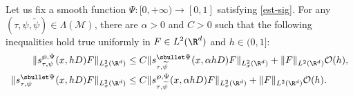 \begin{prop}\label{equiv-eucl}
Let us fix a smooth function $\Psi:[0,+\infty)\to [0,1]$ satisfying \eqref{est-sig}.
For any $(\tau,\psi,\widetilde{\psi})\in \Lambda(\mathcal{M})$, there are $\alpha>0$ and $C>0$ such that
the following inequalities hold true uniformly in $F\in L^2(\R^d)$ and $h\in(0,1]$:
\begin{align}\label{equi-eu1}
\|s_{\tau,\psi}^{\wp,\Psi}(x,hD)F \|_{L_x^2(\R^d)}& \leq C\| s_{\tau,\widetilde{\psi}}^{\sbullet\Psi}(x,\alpha hD)F \|_{L_x^2(\R^d)}+\|F\|_{L^2(\R^d)}\mathcal{O}(h),\\\label{equi-eu2}
\| s_{\tau,\psi}^{\sbullet\Psi}(x,hD)F \|_{L_x^2(\R^d)} & \leq C\|s_{\tau,\widetilde{\psi}}^{\wp,\Psi}(x,\alpha hD)F \|_{L_x^2(\R^d)} +\|F\|_{L^2(\R^d)}\mathcal{O}(h).
\end{align}
\end{prop}
